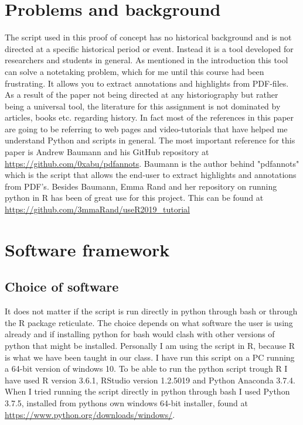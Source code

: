\documentclass{article}
\begin{document}
\section{Problems and background}

The script used in this proof of concept has no historical background and is not directed at a specific historical period or event. Instead it is a tool developed for researchers and students in general. As mentioned in the introduction this tool can solve a notetaking problem, which for me until this course had been frustrating. It allows you to extract annotations and highlights from PDF-files.
As a result of the paper not being directed at any historiography but rather being a universal tool, the literature for this assignment is not dominated by articles, books etc. regarding history. In fact most of the references in this paper are going to be referring to web pages and video-tutorials that have helped me understand Python and scripts in general.
The most important reference for this paper is Andrew Baumann and his GitHub repository at \url{https://github.com/0xabu/pdfannots}. Baumann is the author behind "pdfannots" which is the script that allows the end-user to extract highlights and annotations from PDF's. Besides Baumann, Emma Rand and her repository on running python in R has been of great use for this project. This can be found at \url{https://github.com/3mmaRand/useR2019_tutorial}

\section{Software framework}
\subsection{Choice of software}
It does not matter if the script is run directly in python through bash or through the R package reticulate. The choice depends on what software the user is using already and if installing python for bash would clash with other versions of python that might be installed. Personally I am using the script in R, because R is what we have been taught in our class. I have run this script on a PC running a 64-bit version of windows 10. To be able to run the python script trough R I have used R version 3.6.1, RStudio version 1.2.5019 and Python Anaconda 3.7.4. When I tried running the script directly in python through bash I used Python 3.7.5, installed from pythons own windows 64-bit installer, found at \url{https://www.python.org/downloads/windows/}.
\end{document}
